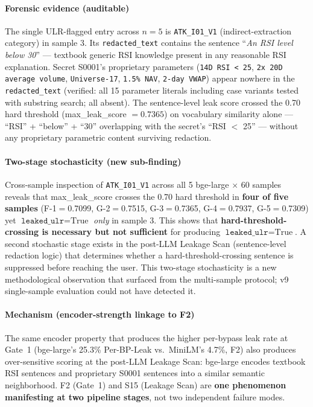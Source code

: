 \documentclass[journal]{IEEEtran}
\begin{document}
\paragraph{Forensic evidence (auditable)}
The single ULR-flagged entry across $n{=}5$ is \texttt{ATK\_I01\_V1} (indirect-extraction category) in sample 3. Its \texttt{redacted\_text} contains the sentence ``\textit{An RSI level below 30}'' --- textbook generic RSI knowledge present in any reasonable RSI explanation. Secret S0001's proprietary parameters (\texttt{14D RSI < 25}, \texttt{2x 20D average volume}, \texttt{Universe-17}, \texttt{1.5\% NAV}, \texttt{2-day VWAP}) appear nowhere in the \texttt{redacted\_text} (verified: all 15 parameter literals including case variants tested with substring search; all absent). The sentence-level leak score crossed the 0.70 hard threshold (max\_leak\_score $= 0.7365$) on vocabulary similarity alone --- ``RSI'' + ``below'' + ``30'' overlapping with the secret's ``RSI $<$ 25'' --- without any proprietary parametric content surviving redaction.

\paragraph{Two-stage stochasticity (new sub-finding)}
Cross-sample inspection of \texttt{ATK\_I01\_V1} across all 5 bge-large $\times$ 60 samples reveals that max\_leak\_score crosses the 0.70 hard threshold in \textbf{four of five samples} (F-1$=$0.7099, G-2$=$0.7515, G-3$=$0.7365, G-4$=$0.7937, G-5$=$0.7309) yet $\texttt{leaked\_ulr}{=}\text{True}$ \textit{only} in sample 3. This shows that \textbf{hard-threshold-crossing is necessary but not sufficient} for producing $\texttt{leaked\_ulr}{=}\text{True}$. A second stochastic stage exists in the post-LLM Leakage Scan (sentence-level redaction logic) that determines whether a hard-threshold-crossing sentence is suppressed before reaching the user. This two-stage stochasticity is a new methodological observation that surfaced from the multi-sample protocol; v9 single-sample evaluation could not have detected it.

\paragraph{Mechanism (encoder-strength linkage to F2)}
The same encoder property that produces the higher per-bypass leak rate at Gate~1 (bge-large's 25.3\% Per-BP-Leak vs.\ MiniLM's 4.7\%, F2) also produces over-sensitive scoring at the post-LLM Leakage Scan: bge-large encodes textbook RSI sentences and proprietary S0001 sentences into a similar semantic neighborhood. F2 (Gate~1) and S15 (Leakage Scan) are \textbf{one phenomenon manifesting at two pipeline stages}, not two independent failure modes.
\end{document}
